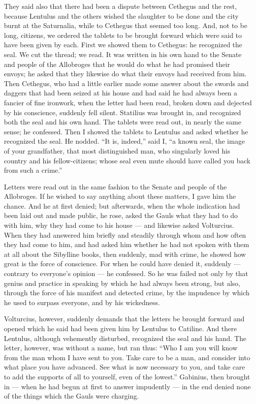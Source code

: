  They said also that there had been a dispute between Cethegus and the rest, because Lentulus and the others wished the slaughter to be done and the city burnt at the Saturnalia, while to Cethegus that seemed too long. And, not to be long, citizens, we ordered the tablets to be brought forward which were said to have been given by each. First we showed them to Cethegus: he recognized the seal. We cut the thread; we read. It was written in his own hand to the Senate and people of the Allobroges that he would do what he had promised their envoys; he asked that they likewise do what their envoys had received from him. Then Cethegus, who had a little earlier made some answer about the swords and daggers that had been seized at his house and had said he had always been a fancier of fine ironwork, when the letter had been read, broken down and dejected by his conscience, suddenly fell silent. Statilius was brought in, and recognized both the seal and his own hand. The tablets were read out, in nearly the same sense; he confessed. Then I showed the tablets to Lentulus and asked whether he recognized the seal. He nodded. ``It is, indeed,'' said I, ``a known seal, the image of your grandfather, that most distinguished man, who singularly loved his country and his fellow-citizens; whose seal even mute should have called you back from such a crime.''

 Letters were read out in the same fashion to the Senate and people of the Allobroges. If he wished to say anything about these matters, I gave him the chance. And he at first denied; but afterwards, when the whole indication had been laid out and made public, he rose, asked the Gauls what they had to do with him, why they had come to his house --- and likewise asked Volturcius. When they had answered him briefly and steadily through whom and how often they had come to him, and had asked him whether he had not spoken with them at all about the Sibylline books, then suddenly, mad with crime, he showed how great is the force of conscience. For when he could have denied it, suddenly --- contrary to everyone's opinion --- he confessed. So he was failed not only by that genius and practice in speaking by which he had always been strong, but also, through the force of his manifest and detected crime, by the impudence by which he used to surpass everyone, and by his wickedness.

 Volturcius, however, suddenly demands that the letters be brought forward and opened which he said had been given him by Lentulus to Catiline. And there Lentulus, although vehemently disturbed, recognized the seal and his hand. The letter, however, was without a name, but ran thus: ``Who I am you will know from the man whom I have sent to you. Take care to be a man, and consider into what place you have advanced. See what is now necessary to you, and take care to add the supports of all to yourself, even of the lowest.'' Gabinius, then brought in --- when he had begun at first to answer impudently --- in the end denied none of the things which the Gauls were charging.

